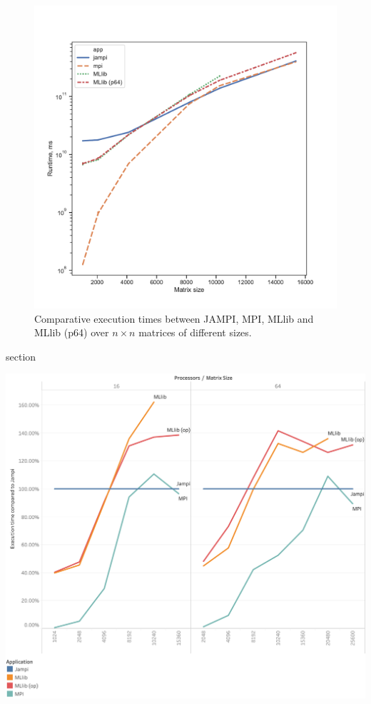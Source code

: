 \documentclass[fleqn,10pt]{SelfArx} %
\begin{document}
\begin{figure}
	\centering
	\includegraphics[width=0.9\linewidth]{figures/runtimes.pdf}
	\vspace{14pt}
	\caption{Comparative execution times between JAMPI, MPI, MLlib and MLlib (p64) over $n \times n$ matrices of different sizes.}
	\label{fig:runtimes}
\end{figure}


section

\includegraphics[width=0.9\linewidth]{compared_to_jampi}
\end{document}
